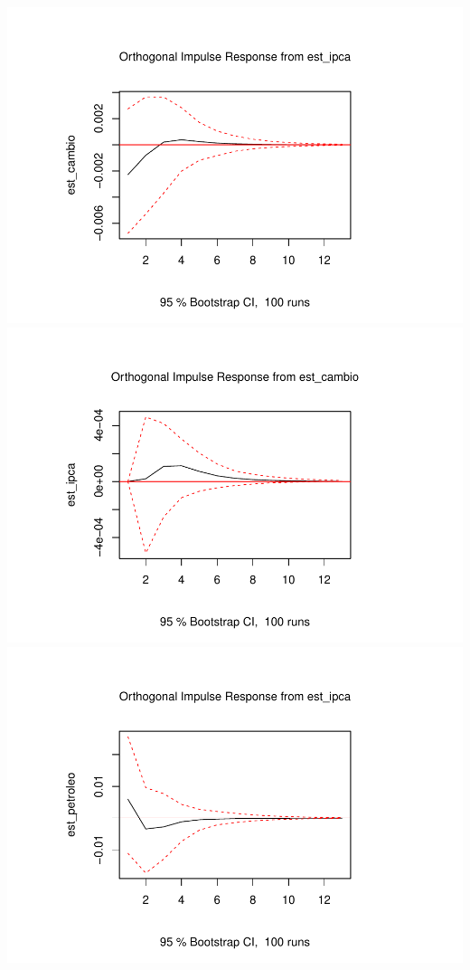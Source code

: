 \documentclass[12pt]{article}
\begin{document}
\includegraphics{artigo_files/figure-latex/unnamed-chunk-14-1.pdf}
\includegraphics{artigo_files/figure-latex/unnamed-chunk-14-2.pdf}
\includegraphics{artigo_files/figure-latex/unnamed-chunk-14-3.pdf}
\end{document}
